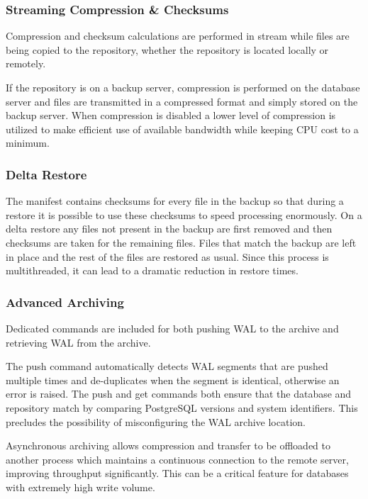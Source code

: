 \documentclass[hyperref={pdfpagelabels=false}]{beamer}
\begin{document}
    \begin{frame}
        \frametitle{Streaming Compression \& Checksums}

        Compression and checksum calculations are performed in stream while files are being copied to the repository, whether the repository is located locally or remotely.
        \par
        If the repository is on a backup server, compression is performed on the database server and files are transmitted in a compressed format and simply stored on the backup server. When compression is disabled a lower level of compression is utilized to make efficient use of available bandwidth while keeping CPU cost to a minimum.
    \end{frame}

    \begin{frame}
        \frametitle{Delta Restore}

        The manifest contains checksums for every file in the backup so that during a restore it is possible to use these checksums to speed processing enormously. On a delta restore any files not present in the backup are first removed and then checksums are taken for the remaining files. Files that match the backup are left in place and the rest of the files are restored as usual. Since this process is multithreaded, it can lead to a dramatic reduction in restore times.
    \end{frame}

    \begin{frame}
        \frametitle{Advanced Archiving}

        Dedicated commands are included for both pushing WAL to the archive and retrieving WAL from the archive.
        \par
        The push command automatically detects WAL segments that are pushed multiple times and de-duplicates when the segment is identical, otherwise an error is raised. The push and get commands both ensure that the database and repository match by comparing PostgreSQL versions and system identifiers. This precludes the possibility of misconfiguring the WAL archive location.
        \par
        Asynchronous archiving allows compression and transfer to be offloaded to another process which maintains a continuous connection to the remote server, improving throughput significantly. This can be a critical feature for databases with extremely high write volume.
    \end{frame}
\end{document}
